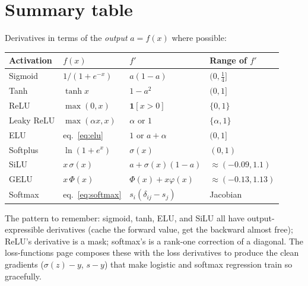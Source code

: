 \documentclass[11pt]{article}
\begin{document}
\section{Summary table}

Derivatives in terms of the \emph{output} $a = f(x)$ where possible:

\begin{center}
\begin{tabular}{llll}
\toprule
Activation & $f(x)$ & $f'$ & Range of $f'$\\
\midrule
Sigmoid & $1/(1+e^{-x})$ & $a(1-a)$ & $(0, \tfrac14]$\\
Tanh & $\tanh x$ & $1 - a^2$ & $(0, 1]$\\
ReLU & $\max(0,x)$ & $\mathbf{1}[x>0]$ & $\{0, 1\}$\\
Leaky ReLU & $\max(\alpha x, x)$ & $\alpha$ or $1$ & $\{\alpha, 1\}$\\
ELU & eq.\ \eqref{eq:elu} & $1$ or $a + \alpha$ & $(0, 1]$\\
Softplus & $\ln(1+e^x)$ & $\sigma(x)$ & $(0,1)$\\
SiLU & $x\,\sigma(x)$ & $a + \sigma(x)(1-a)$ & $\approx(-0.09, 1.1)$\\
GELU & $x\,\Phi(x)$ & $\Phi(x) + x\varphi(x)$ & $\approx(-0.13, 1.13)$\\
Softmax & eq.\ \eqref{eq:softmax} & $s_i(\delta_{ij} - s_j)$ &
Jacobian\\
\bottomrule
\end{tabular}
\end{center}

\medskip
\noindent
The pattern to remember: sigmoid, tanh, ELU, and SiLU all have
output-expressible derivatives (cache the forward value, get the
backward almost free); ReLU's derivative is a mask; softmax's is a
rank-one correction of a diagonal. The loss-functions page composes
these with the loss derivatives to produce the clean gradients
($\sigma(z) - y$, $s - y$) that make logistic and softmax regression
train so gracefully.
\end{document}
